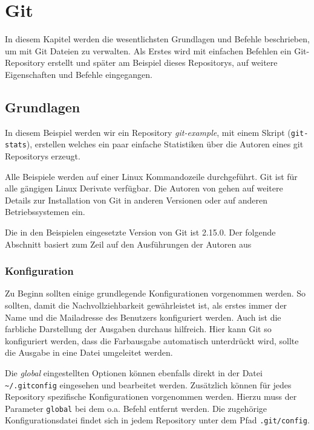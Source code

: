 \chapter{Git}\label{cha:git}
In diesem Kapitel werden die wesentlichsten Grundlagen und Befehle
beschrieben, um mit Git Dateien zu verwalten. Als Erstes wird mit einfachen
Befehlen ein Git-Repository erstellt und später am Beispiel dieses Repositorys,
auf weitere Eigenschaften und Befehle eingegangen.

\section{Grundlagen}\label{gitbasics}
In diesem Beispiel werden wir ein Repository \textit{git-example}, mit einem
Skript (\texttt{git-stats}), erstellen welches ein paar einfache Statistiken
über die Autoren eines git Repositorys erzeugt.

Alle Beispiele werden auf einer Linux Kommandozeile durchgeführt. Git ist für
alle gängigen Linux Derivate verfügbar. Die Autoren von \cite[S.~12-14]{progit}
gehen auf weitere Details zur Installation von Git in anderen Versionen oder
auf anderen Betriebssystemen ein.

Die in den Beispielen eingesetzte Version von Git ist 2.15.0. Der folgende
Abschnitt basiert zum Zeil auf den Ausführungen der Autoren aus
\cite[S.22-57]{gitosp}


\subsection{Konfiguration}\label{gitconfig}
Zu Beginn sollten einige grundlegende Konfigurationen vorgenommen werden. So
sollten, damit die Nachvollziehbarkeit gewährleistet ist, als erstes immer der
Name und die Mailadresse des Benutzers konfiguriert werden. Auch ist die
farbliche Darstellung der Ausgaben durchaus hilfreich. Hier kann Git so
konfiguriert werden, dass die Farbausgabe automatisch unterdrückt wird, sollte
die Ausgabe in eine Datei umgeleitet werden.


Die \textit{global} eingestellten Optionen können ebenfalls direkt in der Datei
\texttt{\textasciitilde/.gitconfig} eingesehen und bearbeitet werden.
Zusätzlich können für jedes Repository spezifische Konfigurationen vorgenommen
werden. Hierzu muss der Parameter \texttt{\-\-global} bei dem o.a. Befehl
entfernt werden. Die zugehörige Konfigurationsdatei findet sich in jedem
Repository unter dem Pfad \texttt{.git/config}.

